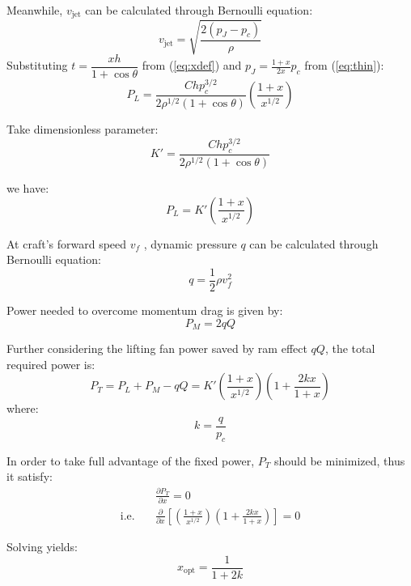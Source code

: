 Meanwhile, $v_{\text{jet}}$ can be calculated through Bernoulli equation:
\begin{equation}
    v_{\text{jet}} = \sqrt{\frac{2(p_J-p_c)}{\rho}}
\end{equation}
    Substituting $t = \dfrac{x h}{1 + \cos\theta}$ from (\ref{eq:xdef}) and $p_J = \frac{1 + x}{2x} p_c$ from (\ref{eq:thin}):
\begin{equation}
    P_L = \frac{C h p_c^{3/2}}{2 \rho^{1/2} (1 + \cos\theta)} \left( \frac{1 + x}{x^{1/2}} \right) \label{eq:p0}
\end{equation}


Take dimensionless parameter:
\begin{equation}
K' = \frac{Chp_c^{3/2}}{2\rho^{1/2}(1 + \cos \theta)}
\end{equation}

we have:
\begin{equation}
    P_L = K' \left( \frac{1 + x}{x^{1/2}} \right)
\end{equation}

At craft's forward speed $v_f$ , dynamic pressure $q$ can be calculated through Bernoulli equation:
\begin{equation}
    q = \frac{1}{2} \rho v_f^2
\end{equation}

Power needed to overcome momentum drag is given by: 
\begin{equation}
    P_M = 2 q Q \label{eq:pm} 
\end{equation}

Further considering the lifting fan power saved by ram effect $qQ$,
the total required power is:
\begin{equation}
    P_T = P_L + P_M -qQ
    = K' (\frac{1 + x}{x^{1/2}}) ( 1 + \frac{2 k x}{1 + x} )
\end{equation}
where: 
\begin{equation}
    k = \frac{q}{p_c}
\end{equation}



In order to take full advantage of the fixed power, $P_T$ should be minimized, thus it satisfy:
\begin{align}
    &\frac{\partial P_{T}}{\partial x}= 0 \\
    \text{i.e.} \quad&\frac{\partial}{\partial x} \left[ \left( \frac{1 + x}{x^{1/2}} \right) \left(1 + \frac{2 k x}{1 + x} \right) \right]= 0
\end{align}

Solving yields:
\begin{equation}
    \boxed{ x_{\text{opt}} = \frac{1}{1 + 2k} } \label{eq:xopt}
\end{equation}

